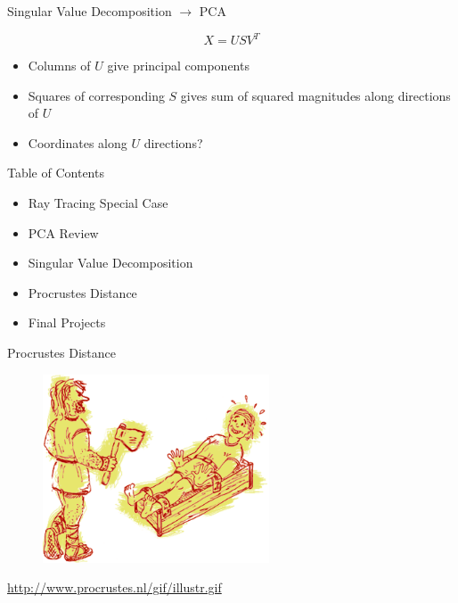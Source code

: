 \documentclass{beamer}
\begin{document}
\begin{frame}{Singular Value Decomposition $\rightarrow$ PCA}

\[ X = U S V^T \]

\begin{itemize}[label=$\vartriangleright$]

\item Columns of $U$ give principal components

\item Squares of corresponding $S$ gives sum of squared magnitudes along directions of $U$

\item Coordinates along $U$ directions?

\end{itemize}

\end{frame}


\begin{frame}{Table of Contents}
\begin{itemize}[label=$\vartriangleright$]
	\item Ray Tracing Special Case
\end{itemize}
\begin{itemize}[label=$\vartriangleright$]
	\item PCA Review
\end{itemize}
\begin{itemize}[label=$\vartriangleright$]
	\item Singular Value Decomposition
\end{itemize}
\begin{itemize}[label=$\blacktriangleright$]
	\item Procrustes Distance
\end{itemize}
\begin{itemize}[label=$\vartriangleright$]
	\item Final Projects
\end{itemize}
\end{frame}


\begin{frame}{Procrustes Distance}

\begin{figure}[t]
	\centering
    \includegraphics[width=0.6\textwidth]{procrustes.png}
\end{figure}

\url{http://www.procrustes.nl/gif/illustr.gif}

\end{frame}
\end{document}
